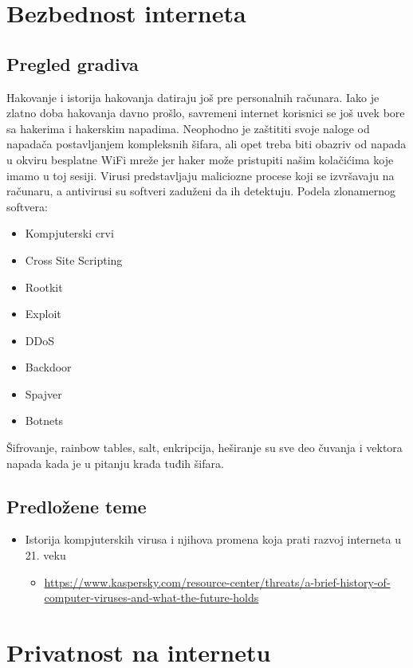 \documentclass[a4paper,12pt]{article}
\begin{document}
\section{Bezbednost interneta}
\subsection{Pregled gradiva}

Hakovanje i istorija hakovanja datiraju još pre personalnih računara. Iako je zlatno doba hakovanja davno prošlo, savremeni internet korisnici se još uvek bore sa hakerima i hakerskim napadima. Neophodno je zaštititi svoje naloge od napadača postavljanjem kompleksnih šifara, ali opet treba biti obazriv od napada u okviru besplatne WiFi mreže jer haker može pristupiti našim kolačićima koje imamo u toj sesiji.
Virusi predstavljaju maliciozne procese koji se izvršavaju na računaru, a antivirusi su softveri zaduženi da ih detektuju.
Podela zlonamernog softvera:
\begin{itemize}
    \item Kompjuterski crvi
    \item Cross Site Scripting
    \item Rootkit
    \item Exploit
    \item DDoS
    \item Backdoor
    \item Spajver
    \item Botnets
\end{itemize}
Šifrovanje, rainbow tables, salt, enkripcija, heširanje su sve deo čuvanja i vektora napada kada je u pitanju krađa tuđih šifara.
\subsection{Predložene teme}
\begin{itemize}
    \item Istorija kompjuterskih virusa i njihova promena koja prati razvoj interneta u 21. veku
    \begin{itemize}
        \item \url{https://www.kaspersky.com/resource-center/threats/a-brief-history-of-computer-viruses-and-what-the-future-holds}
    \end{itemize}
\end{itemize}
\section{Privatnost na internetu}
\end{document}
